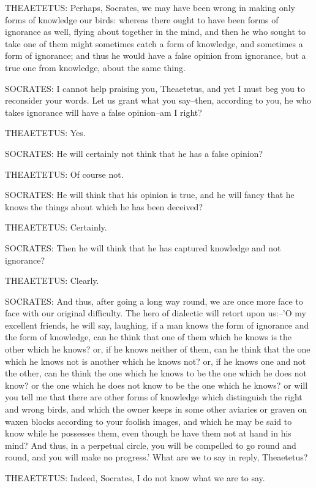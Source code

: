 THEAETETUS: Perhaps, Socrates, we may have been wrong in making only
forms of knowledge our birds: whereas there ought to have been forms of
ignorance as well, flying about together in the mind, and then he who
sought to take one of them might sometimes catch a form of knowledge,
and sometimes a form of ignorance; and thus he would have a false
opinion from ignorance, but a true one from knowledge, about the same
thing.

SOCRATES: I cannot help praising you, Theaetetus, and yet I must beg you
to reconsider your words. Let us grant what you say--then, according to
you, he who takes ignorance will have a false opinion--am I right?

THEAETETUS: Yes.

SOCRATES: He will certainly not think that he has a false opinion?

THEAETETUS: Of course not.

SOCRATES: He will think that his opinion is true, and he will fancy that
he knows the things about which he has been deceived?

THEAETETUS: Certainly.

SOCRATES: Then he will think that he has captured knowledge and not
ignorance?

THEAETETUS: Clearly.

SOCRATES: And thus, after going a long way round, we are once more face
to face with our original difficulty. The hero of dialectic will retort
upon us:--'O my excellent friends, he will say, laughing, if a man knows
the form of ignorance and the form of knowledge, can he think that one
of them which he knows is the other which he knows? or, if he knows
neither of them, can he think that the one which he knows not is another
which he knows not? or, if he knows one and not the other, can he think
the one which he knows to be the one which he does not know? or the one
which he does not know to be the one which he knows? or will you tell me
that there are other forms of knowledge which distinguish the right and
wrong birds, and which the owner keeps in some other aviaries or graven
on waxen blocks according to your foolish images, and which he may be
said to know while he possesses them, even though he have them not at
hand in his mind? And thus, in a perpetual circle, you will be compelled
to go round and round, and you will make no progress.' What are we to
say in reply, Theaetetus?

THEAETETUS: Indeed, Socrates, I do not know what we are to say.

